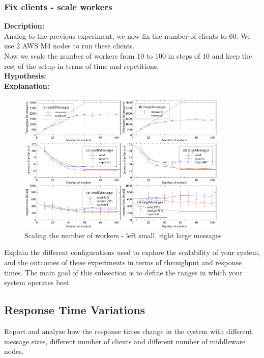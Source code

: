 \documentclass[11pt]{article}
\begin{document}
\subsubsection{Fix clients - scale workers}
\textbf{Decription:}\\
Analog to the previous experiment, we now fix the number of clients to 60. We use 2 AWS M4 nodes to run these clients.\\
Now we scale the number of workers from 10 to 100 in steps of 10 and keep the rest of the setup in terms of time and repetitions.\\
\textbf{Hypothesis:}\\
\textbf{Explanation:}\\
\begin{figure}[ht]
  \begin{center}
    \includegraphics[width=0.9\textwidth]{../results/maxworkerperinstance.pdf}
    \caption{Scaling the number of workers - left small, right large messages}
    \label{fig:maxworkerperinstance}
  \end{center}
\end{figure}
Explain the different configurations used to explore the scalability of
your system, and the outcomes of these experiments in terms of
throughput and response times. The main goal of this subsection is to
define the ranges in which your system operates best.

\subsection{Response Time Variations}\label{sec:response-time-variations}

Report and analyze how the response times change in the system with
different message sizes, different number of clients and different
number of middleware nodes.
\end{document}
